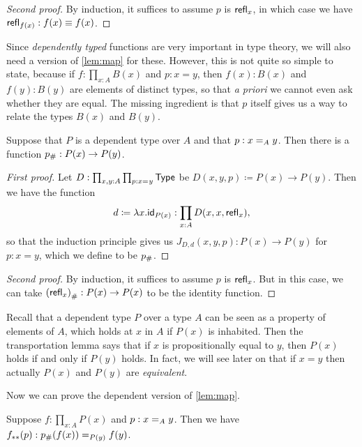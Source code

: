 \begin{proof}[Second proof]
  By induction, it suffices to assume $p$ is $\refl{x}$, in which case we have $\refl{f(x)}:f(x)\jdeq f(x)$.
\end{proof}

Since \emph{dependently typed} functions are very important in type theory, we will also need a version of \autoref{lem:map} for these.
However, this is not quite so simple to state, because if $f:\prod_{x:A} B(x)$ and $p:x=y$, then $f(x):B(x)$ and $f(y):B(y)$ are elements of distinct types, so that \emph{a priori} we cannot even ask whether they are equal.
The missing ingredient is that $p$ itself gives us a way to relate the types $B(x)$ and $B(y)$.

\begin{lem}[Transport]\label{lem:transport}
  Suppose that $P$ is a dependent type over $A$ and that $p:\id[A]xy$.
  Then there is a function $\transf{p}:P(x)\to P(y)$.
\end{lem}

\begin{proof}[First proof]
  Let $D:\prod_{x,y:A} \prod_{p:\id{x}{y}} \type$ be $D(x,y,p)\coloneqq P(x)\to P(y)$.
  Then we have the function
  \begin{equation*}
    d\coloneqq\lambda x.\idfunc[P(x)]:\prod_{x:A} D(x,x,\refl{x}),
  \end{equation*}
  so that the induction principle gives us $J_{D,d}(x,y,p):P(x)\to P(y)$ for $p:x= y$, which we define to be $\transf p$.
\end{proof}

\begin{proof}[Second proof]
  By induction, it suffices to assume $p$ is $\refl x$.
  But in this case, we can take $\transf{(\refl x)}:P(x)\to P(x)$ to be the identity function.
\end{proof}

Recall that a dependent type $P$ over a type $A$ can be seen as a property of elements of $A$, which holds at $x$ in $A$ if $P(x)$ is inhabited.
Then the transportation lemma says that if $x$ is propositionally equal to $y$, then $P(x)$ holds if and only if $P(y)$ holds.
In fact, we will see later on that if $x=y$ then actually $P(x)$ and $P(y)$ are \emph{equivalent}.

Now we can prove the dependent version of \autoref{lem:map}.

\begin{lem}\label{lem:mapdep}
  Suppose $f:\prod_{x: A} P(x)$ and $p:\id[A]xy$.
  Then we have $\mapdep fp:\id[P(y)]{\trans p{f(x)}}{f(y)}$.
\end{lem}

